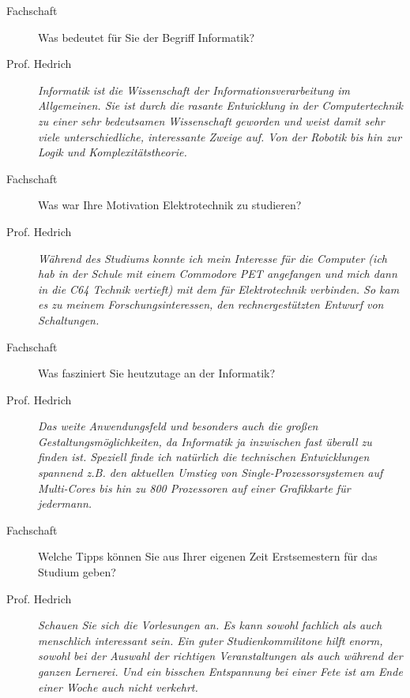 \begin{description}

\item[Fachschaft]

Was bedeutet für Sie der Begriff Informatik?

\item[Prof. Hedrich]

\textit{Informatik ist die Wissenschaft der Informationsverarbeitung im Allgemeinen.
Sie ist durch die rasante Entwicklung in der Computertechnik zu einer sehr
bedeutsamen Wissenschaft geworden und weist damit sehr viele unterschiedliche,
interessante Zweige auf. Von der Robotik bis hin zur Logik und Komplexitätstheorie.}



\item[Fachschaft]

Was war Ihre Motivation Elektrotechnik zu studieren?

\item[Prof. Hedrich]

\textit{Während des Studiums konnte ich mein Interesse für die Computer (ich hab
in der Schule mit einem Commodore PET angefangen und mich dann in
die C64 Technik vertieft) mit dem für Elektrotechnik verbinden.
So kam es zu meinem Forschungsinteressen, den rechnergestützten Entwurf von
Schaltungen.}

\item[Fachschaft]

Was fasziniert Sie heutzutage an der Informatik?

\item[Prof. Hedrich]

\textit{Das weite Anwendungsfeld und besonders auch die großen
Gestaltungsmöglichkeiten, da Informatik ja inzwischen fast überall
zu finden ist. Speziell finde ich natürlich die technischen Entwicklungen
spannend z.B. den aktuellen Umstieg von Single-Prozessorsystemen auf
Multi-Cores bis hin zu 800 Prozessoren auf einer Grafikkarte für
jedermann.}

\item[Fachschaft]

Welche Tipps können Sie aus Ihrer eigenen Zeit Erstsemestern für das Studium geben?

\item[Prof. Hedrich]

\textit{Schauen Sie sich die Vorlesungen an. Es kann sowohl fachlich als auch
menschlich interessant sein. Ein guter Studienkommilitone hilft enorm,
sowohl bei der Auswahl der richtigen Veranstaltungen als auch während der
ganzen Lernerei. Und ein bisschen Entspannung bei einer Fete ist am Ende einer Woche
auch nicht verkehrt.}

\end{description}




\spaltenende
